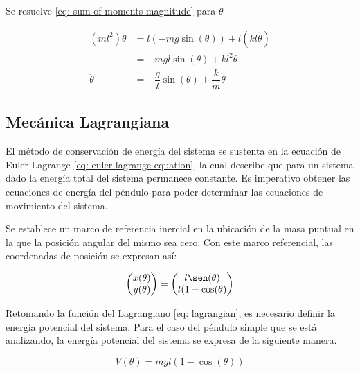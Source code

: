 Se resuelve \eqref{eq: sum of moments magnitude} para $\ddot{\theta}$


\begin{equation}
\begin{split}
 (m l^2) \ddot{\theta} &= l (-m g \sin(\theta))  + l (k l \dot{\theta})\\
 &= - mgl \sin(\theta) + kl^2 \dot{\theta}\\
 \ddot{\theta} &= - \dfrac{g}{l} \sin(\theta) + \dfrac{k}{m} \dot{\theta}
\end{split}
 \label{eq: angular acceleration newton}
\end{equation}


\subsection{Mecánica Lagrangiana}

El método de conservación de energía del sistema se sustenta
en la ecuación de Euler-Lagrange \eqref{eq: euler lagrange equation}, 
la cual describe que para un sistema dado la 
energía total del sistema permanece constante.
Es imperativo obtener las ecuaciones de energía del péndulo
para poder determinar las ecuaciones de movimiento del sistema.

Se establece un marco de referencia inercial en la ubicación de
la masa puntual en la que la posición angular del mismo sea cero.
Con este marco referencial, las coordenadas de posición se expresan
así: 

\begin{equation}
\begin{pmatrix}
x(\theta)\\
y(\theta)
\end{pmatrix}
= 
\begin{pmatrix}
l\sen(\theta)\\
l(1 - \cos(\theta)
\end{pmatrix}
\label{eq: lagrange position coordinates}
\end{equation}


Retomando la función del Lagrangiano \eqref{eq: lagrangian}, 
es necesario definir la energía potencial del sistema.
Para el caso del péndulo simple que se está analizando, 
la energía potencial del sistema se expresa de la siguiente manera.

\begin{equation}
 V(\theta) = m g l ( 1 - \cos (\theta) )
 \label{V_equ}
\end{equation}

